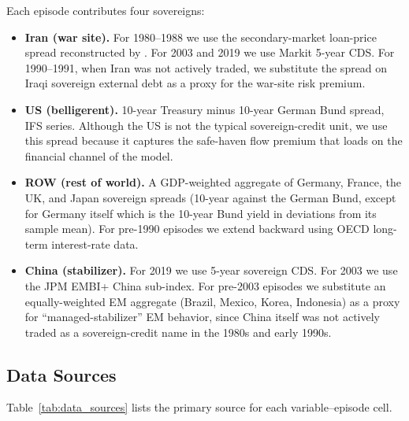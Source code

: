 \documentclass[12pt,a4paper]{article}
\begin{document}
Each episode contributes four sovereigns:
\begin{itemize}[itemsep=2pt, topsep=2pt]
    \item \textbf{Iran (war site).} For 1980--1988 we use the secondary-market loan-price spread reconstructed by \citet{borensztein2013debt}. For 2003 and 2019 we use Markit 5-year CDS. For 1990--1991, when Iran was not actively traded, we substitute the spread on Iraqi sovereign external debt as a proxy for the war-site risk premium.
    \item \textbf{US (belligerent).} 10-year Treasury minus 10-year German Bund spread, IFS series. Although the US is not the typical sovereign-credit unit, we use this spread because it captures the safe-haven flow premium that loads on the financial channel of the model.
    \item \textbf{ROW (rest of world).} A GDP-weighted aggregate of Germany, France, the UK, and Japan sovereign spreads (10-year against the German Bund, except for Germany itself which is the 10-year Bund yield in deviations from its sample mean). For pre-1990 episodes we extend backward using OECD long-term interest-rate data.
    \item \textbf{China (stabilizer).} For 2019 we use 5-year sovereign CDS. For 2003 we use the JPM EMBI+ China sub-index. For pre-2003 episodes we substitute an equally-weighted EM aggregate (Brazil, Mexico, Korea, Indonesia) as a proxy for ``managed-stabilizer'' EM behavior, since China itself was not actively traded as a sovereign-credit name in the 1980s and early 1990s.
\end{itemize}

\subsection{Data Sources}

Table~\ref{tab:data_sources} lists the primary source for each variable--episode cell.
\end{document}
